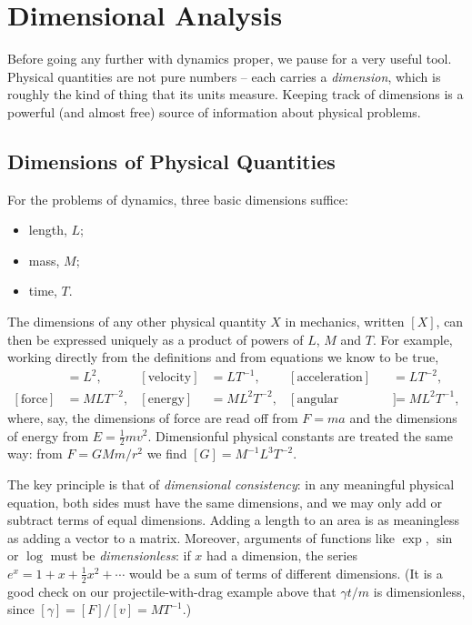 \documentclass[a4paper]{scrartcl}
\begin{document}
\section{Dimensional Analysis}

Before going any further with dynamics proper, we pause for a very useful tool. Physical quantities are not pure numbers -- each carries a \emph{dimension}, which is roughly the kind of thing that its units measure. Keeping track of dimensions is a powerful (and almost free) source of information about physical problems.

\subsection{Dimensions of Physical Quantities}

For the problems of dynamics, three basic dimensions suffice:
\begin{itemize}
	\item length, $L$;
	\item mass, $M$;
	\item time, $T$.
\end{itemize}
The dimensions of any other physical quantity $X$ in mechanics, written $[X]$, can then be expressed uniquely as a product of powers of $L$, $M$ and $T$. For example, working directly from the definitions and from equations we know to be true,
\begin{align*}
	[\text{area}] &= L^2, & [\text{velocity}] &= LT^{-1}, & [\text{acceleration}] &= LT^{-2}, \\
	[\text{force}] &= MLT^{-2}, & [\text{energy}] &= ML^2T^{-2}, & [\text{angular momentum}] &= ML^2 T^{-1},
\end{align*}
where, say, the dimensions of force are read off from $F = ma$ and the dimensions of energy from $E = \frac{1}{2}mv^2$. Dimensionful physical constants are treated the same way: from $F = GMm/r^2$ we find $[G] = M^{-1}L^3T^{-2}$.

The key principle is that of \emph{dimensional consistency}: in any meaningful physical equation, both sides must have the same dimensions, and we may only add or subtract terms of equal dimensions. Adding a length to an area is as meaningless as adding a vector to a matrix. Moreover, arguments of functions like $\exp$, $\sin$ or $\log$ must be \emph{dimensionless}: if $x$ had a dimension, the series $e^x = 1 + x + \frac{1}{2}x^2 + \cdots$ would be a sum of terms of different dimensions. (It is a good check on our projectile-with-drag example above that $\gamma t/m$ is dimensionless, since $[\gamma] = [F]/[v] = MT^{-1}$.)
\end{document}
